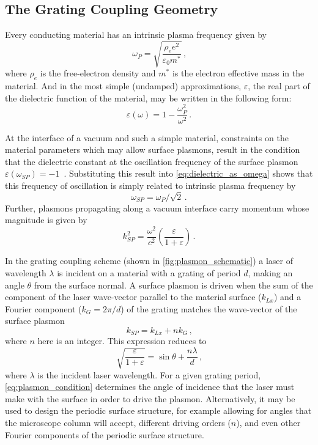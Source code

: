 \subsection{The Grating Coupling Geometry}

Every conducting material has an intrinsic plasma frequency given by 
\begin{equation}
  \omega_{P} = \sqrt{\frac{\rho_{e} e^2}{\varepsilon_{0} m^*}} \,\text{,}
\end{equation}
where $\rho_{e}$ is the free-electron density and $m^*$ is the electron effective mass in the material.
And in the most simple (undamped) approximations, $\varepsilon$, the real part of the dielectric function of the material, may be written in the following form:
\begin{equation} \label{eq:dielectric_as_omega}
  \varepsilon(\omega) = 1 - \frac{ \omega_{P}^2 }{ \omega^2 } \,\text{.}
\end{equation}

At the interface of a vacuum and such a simple material, constraints on the material parameters which may allow surface plasmons, result in the condition that the dielectric constant at the oscillation frequency of the surface plasmon $ \varepsilon(\omega_{SP}) = -1 $~\cite{cottam_introduction_2004}.
Substituting this result into \ref{eq:dielectric_as_omega} shows that this frequency of oscillation is simply related to intrinsic plasma frequency by
\begin{equation}
  \omega_{SP} = \omega_{P} / \sqrt{2} \,\text{.}
\end{equation}
Further, plasmons propagating along a vacuum interface carry momentum whose magnitude is given by 
\begin{equation}
  k_{SP}^2 = \frac{\omega^2}{c^2} \left( \frac{ \varepsilon }{ 1 + \varepsilon } \right) \,\text{.}
\end{equation}

In the grating coupling scheme (shown in \ref{fig:plasmon_schematic}) a laser of wavelength $\lambda$ is incident on a material with a grating of period $d$, making an angle $\theta$ from the surface normal.
A surface plasmon is driven when the sum of the component of the laser wave-vector parallel to the material surface ($k_{Lx}$) and a Fourier component ($k_{G} = 2 \pi / d$) of the grating matches the wave-vector of the surface plasmon
\begin{equation}
  k_{SP} = k_{Lx} + n k_{G} \,\text{,}
\end{equation}
where $n$ here is an integer.
This expression reduces to 
\begin{equation} \label{eq:plasmon_condition}
  \sqrt{ \frac{ \varepsilon }{ 1 + \varepsilon } } = \sin \theta + \frac{ n \lambda }{ d } \,\text{,}
\end{equation}
where $\lambda$ is the incident laser wavelength.
For a given grating period, \ref{eq:plasmon_condition} determines the angle of incidence that the laser must make with the surface in order to drive the plasmon.
Alternatively, it may be used to design the periodic surface structure, for example allowing for angles that the microscope column will accept, different driving orders ($n$), and even other Fourier components of the periodic surface structure.

